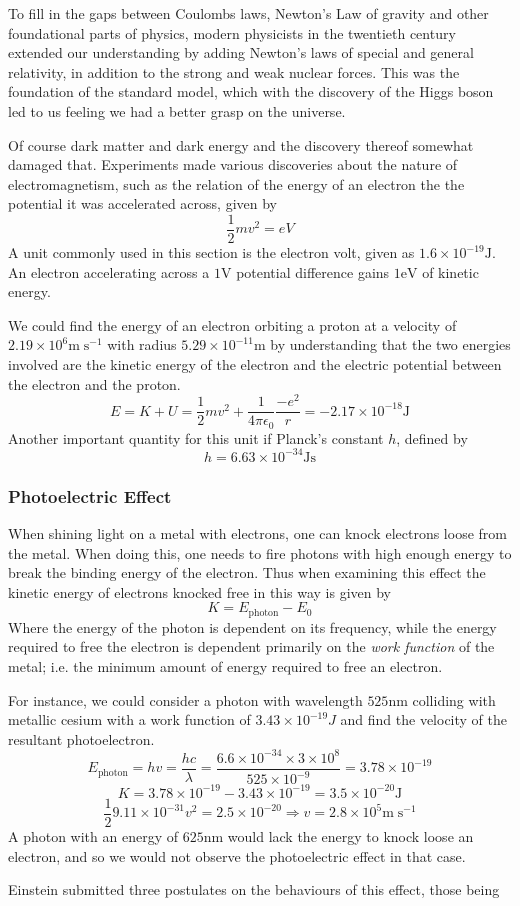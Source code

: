 \documentclass[12pt]{report}
\begin{document}
\begin{flushleft}
To fill in the gaps between Coulombs laws, Newton's Law of gravity and other
foundational parts of physics, modern physicists in the twentieth century
extended our understanding by adding Newton's laws of special and general
relativity, in addition to the strong and weak nuclear forces. This was the
foundation of the standard model, which with the discovery of the Higgs boson
led to us feeling we had a better grasp on the universe. \par
Of course dark matter and dark energy and the discovery thereof somewhat
damaged that. Experiments made various discoveries about the nature of
electromagnetism, such as the relation of the energy of an electron the the
potential it was accelerated across, given by
\[\frac{1}{2}mv^2 = eV\]
A unit commonly used in this section is the electron volt, given as
\(1.6\times10^{-19}\mathrm{J}\). An electron accelerating across a
\(1\mathrm{V}\) potential difference gains \(1\mathrm{eV}\) of kinetic
energy. \par
We could find the energy of an electron orbiting a proton at a velocity of
\(2.19\times10^6\mathrm{m\;s^{-1}}\) with radius
\(5.29\times10^{-11}\mathrm{m}\) by understanding that the two energies
involved are the kinetic energy of the electron and the electric potential
between the electron and the proton.
\[E = K + U = \frac{1}{2}mv^2 + \frac{1}{4\pi\epsilon_0}\frac{-e^2}{r}
= -2.17\times10^{-18}\mathrm{J}\]
Another important quantity for this unit if Planck's constant \(h\),
defined by
\[h = 6.63\times10^{-34}\mathrm{Js}\]


\subsubsection*{Photoelectric Effect}

When shining light on a metal with electrons, one can knock electrons loose
from the metal. When doing this, one needs to fire photons with high enough
energy to break the binding energy of the electron. Thus when examining this
effect the kinetic energy of electrons knocked free in this way is given by
\[K = E_\mathrm{photon} - E_0\]
Where the energy of the photon is dependent on its frequency, while the energy
required to free the electron is dependent primarily on the \textit{work
function} of the metal; i.e. the minimum amount of energy required to free an
electron. \par
For instance, we could consider a photon with wavelength \(525\mathrm{nm}\)
colliding with metallic cesium with a work function of \(3.43\times10^{-19}J\)
and find the velocity of the resultant photoelectron.
\[E_\mathrm{photon} = hv = \frac{hc}{\lambda} 
= \frac{6.6\times10^{-34}\times3\times10^8}{525\times10^{-9}}
= 3.78\times10^{-19}\]
\[K = 3.78\times10^{-19} - 3.43\times10^{-19} = 3.5\times10^{-20}\mathrm{J}\]
\[\frac{1}{2}{9.11\times10^{-31}}v^2 = 2.5\times10^{-20} \Rightarrow
v = 2.8\times10^5\mathrm{m\;s^{-1}}\]
A photon with an energy of \(625\mathrm{nm}\) would lack the energy to knock
loose an electron, and so we would not observe the photoelectric effect in that
case. \par
Einstein submitted three postulates on the behaviours of this effect, those
being


\end{flushleft}
\end{document}

